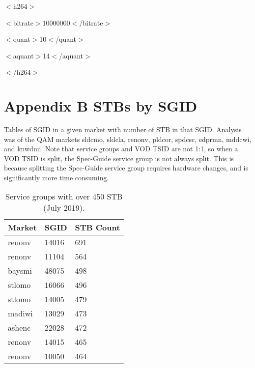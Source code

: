 \documentclass{article}
\begin{document}
$<$h264$>$

$<$bitrate$>$10000000$<$/bitrate$>$

$<$quant$>$10$<$/quant$>$

$<$aquant$>$14$<$/aquant$>$

$<$/h264$>$



\newpage

\section{Appendix B\: STBs by SGID}
\label{APPENDIX-CustBySGID}

Tables of SGID in a given market with number of STB in that SGID. Analysis was of the QAM markets sldcmo, sldcla, renonv, pldcor, spdcsc, edprmn, mddcwi, and knwdmi. Note that service groups and VOD TSID are not 1:1, so when a VOD TSID is split, the Spec-Guide service group is not always split. This is because splitting the Spec-Guide service group requires hardware changes, and is significantly more time consuming. 

\begin{table}[h]
\centering
\begin{tabular}{|l|l|l|} 
\hline Market & SGID & STB Count \\
\hline renonv & 14016 & 691 \\  
\hline renonv & 11104 & 564 \\
\hline baysmi & 48075 & 498 \\
\hline stlomo & 16066 & 496 \\
\hline stlomo & 14005 & 479 \\
\hline madiwi & 13029 & 473 \\
\hline ashenc & 22028 & 472 \\
\hline renonv & 14015 & 465 \\
\hline renonv & 10050 & 464 \\
\hline
\end{tabular}
\caption{\label{TABLE-HighSGUse} Service groups with over 450 STB (July 2019).} 
\end{table}
\end{document}
